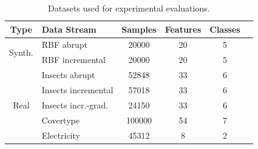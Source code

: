 \documentclass[letterpaper]{article} %
\begin{document}
\begin{table}[ht]
	\small
	\begin{tabular}{@{}clcccc@{}}
		\toprule
		Type                    & Data Stream            & Samples & Features & Classes \\
		\midrule
		\multirow{2}{*}{Synth.} & RBF abrupt             & 20000   & 20       & 5       \\
		                        & RBF incremental        & 20000   & 20       & 5       \\
		\midrule
		\multirow{5}{*}{Real}   & Insects abrupt         & 52848   & 33       & 6       \\
		                        & Insects incremental    & 57018   & 33       & 6       \\
		                        & Insects incr.-grad.    & 24150   & 33       & 6       \\
		                        & Covertype\footnotemark & 100000  & 54       & 7       \\
		                        & Electricity            & 45312   & 8        & 2       \\
		\bottomrule
	\end{tabular}\label{tab:datasets}
	\caption{Datasets used for experimental evaluations.}
\end{table}

\end{document}
